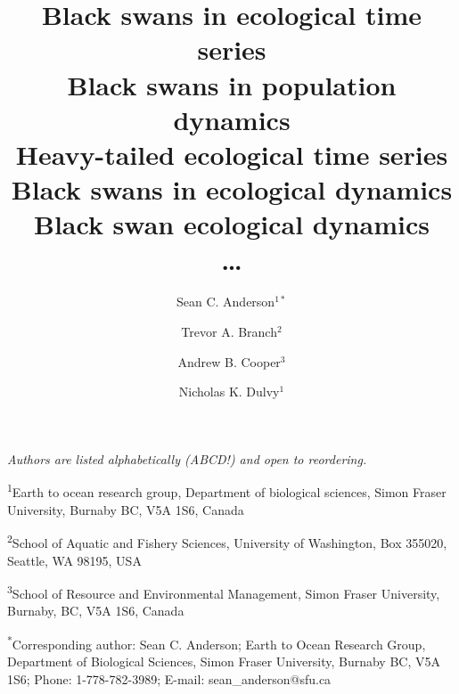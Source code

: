 \documentclass[12pt]{article}
\title{Black swans in ecological time series\\
  Black swans in population dynamics\\
  Heavy-tailed ecological time series\\
  Black swans in ecological dynamics\\
  Black swan ecological dynamics\\
  \ldots}
\author{
Sean C. Anderson$^{1\ast}$ \and
Trevor A. Branch$^2$ \and
Andrew B. Cooper$^3$ \and
Nicholas K. Dulvy$^1$
}
\date{}
\begin{document}
\maketitle
\doublespacing


\noindent
\emph{Authors are listed alphabetically (ABCD!) and open to reordering.}

\noindent
\textsuperscript{1}Earth to ocean research group,
Department of biological sciences,
Simon Fraser University, Burnaby BC, V5A 1S6, Canada

\noindent
\textsuperscript{2}School of Aquatic and Fishery Sciences,
University of Washington, Box 355020, Seattle, WA 98195, USA

\noindent
\textsuperscript{3}School of Resource and Environmental Management,
Simon Fraser University, Burnaby, BC, V5A 1S6, Canada

\noindent
\textsuperscript{*}Corresponding author: Sean C. Anderson;
Earth to Ocean Research Group,
Department of Biological Sciences,
Simon Fraser University,
Burnaby BC, V5A 1S6;
Phone: 1-778-782-3989;
E-mail: sean\_anderson@sfu.ca

\thispagestyle{empty}

\linenumbers





\renewcommand{\thetable}{S\arabic{table}}
\setcounter{table}{0}




\end{document}
